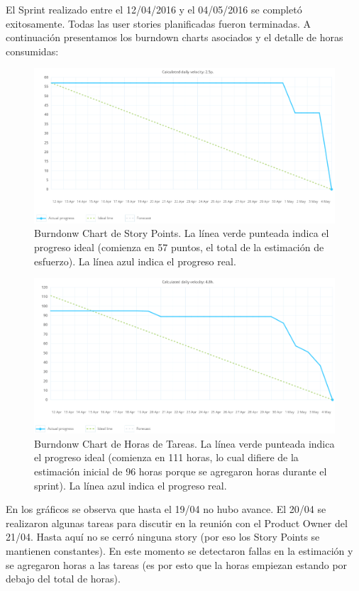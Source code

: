 El Sprint realizado entre el 12/04/2016 y el 04/05/2016 se completó exitosamente. Todas las user stories planificadas fueron terminadas.
A continuación presentamos los burndown charts asociados y el detalle de horas consumidas:

\begin{figure}[h!]
 \includegraphics[width=\textwidth]{imagenes/burndown-points.png}
 \caption{Burndonw Chart de Story Points. La línea verde punteada indica el progreso ideal (comienza en 57 puntos, el total de la estimación de esfuerzo).
 La línea azul indica el progreso real.}
\end{figure}

\begin{figure}[h!]
 \includegraphics[width=\textwidth]{imagenes/burndown-hours.png}
 \caption{Burndonw Chart de Horas de Tareas. La línea verde punteada indica el progreso ideal (comienza en 111 horas, lo cual difiere de la estimación
 inicial de 96 horas porque se agregaron horas durante el sprint). La línea azul indica el progreso real.}
\end{figure}

En los gráficos se observa que hasta el 19/04 no hubo avance. El 20/04 se realizaron algunas tareas para discutir en la reunión con el Product Owner del
21/04. Hasta aquí no se cerró ninguna story (por eso los Story Points se mantienen constantes). En este momento se detectaron fallas en la estimación
y se agregaron horas a las tareas (es por esto que la horas empiezan estando por debajo del total de horas).

